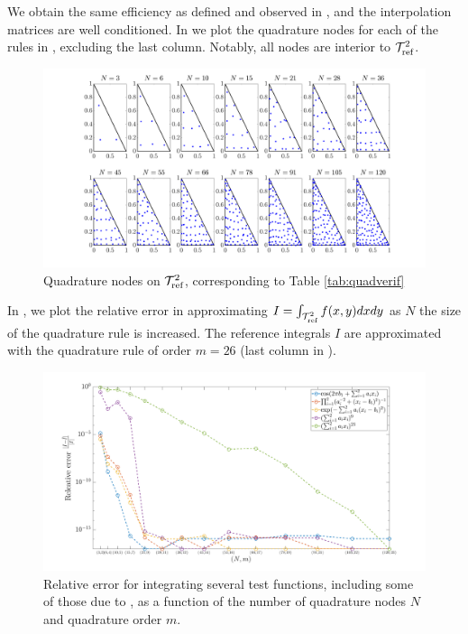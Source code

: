 We obtain the same efficiency as defined and observed in \cite{vrquad}, and the interpolation matrices are well conditioned. In  we plot the quadrature nodes for each of the rules in , excluding the last column. Notably, all nodes are interior to $\mathcal{T}_{\text{ref}}^2$. 
\begin{figure}[H]
	\centering
	\includegraphics[width=1\linewidth]{./figures/triquadLeg_plot}
	\caption{Quadrature nodes on $\mathcal{T}_{\text{ref}}^2$, corresponding to Table \ref{tab:quadverif}}\label{fig:triquadlegplot}
\end{figure}
In , we plot the relative error in approximating $I = \int_{\mathcal{T}_{\text{ref}}^2} f(x,y) dxdy$ as $N$ the size of the quadrature rule is increased. The reference integrals $I$ are approximated with the quadrature rule of order $m=26$ (last column in ).
\begin{figure}[H]
	\centering
	\includegraphics[width=0.9\linewidth]{./figures/triquadLeg_err}
	\caption{Relative error for integrating several test functions, including some of those due to \cite{genz}, as a function of the number of quadrature nodes $N$ and quadrature order $m$.}\label{fig:triquadlegerr}
\end{figure}

